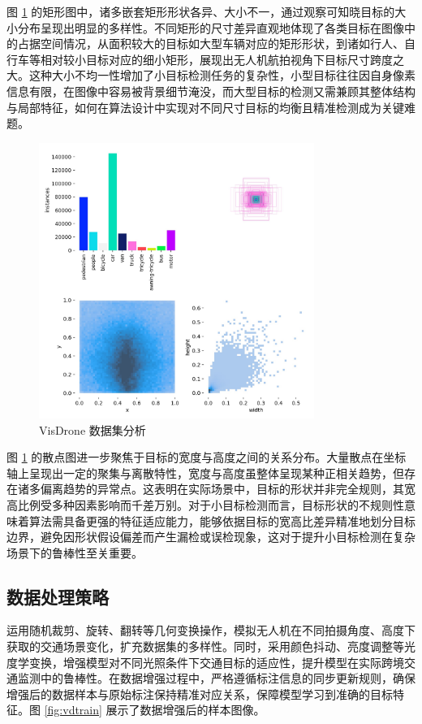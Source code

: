 \documentclass[runningheads]{llncs}
\begin{document}
图 \ref{fig:vdlabels} 的矩形图中，诸多嵌套矩形形状各异、大小不一，通过观察可知晓目标的大小分布呈现出明显的多样性。不同矩形的尺寸差异直观地体现了各类目标在图像中的占据空间情况，从面积较大的目标如大型车辆对应的矩形形状，到诸如行人、自行车等相对较小目标对应的细小矩形，展现出无人机航拍视角下目标尺寸跨度之大。这种大小不均一性增加了小目标检测任务的复杂性，小型目标往往因自身像素信息有限，在图像中容易被背景细节淹没，而大型目标的检测又需兼顾其整体结构与局部特征，如何在算法设计中实现对不同尺寸目标的均衡且精准检测成为关键难题。

\begin{figure}[htbp]
    \centering
    \includegraphics[width=0.8\textwidth]{../figure/labels.jpg}
    \caption{VisDrone 数据集分析}
    \label{fig:vdlabels}
\end{figure}

图 \ref{fig:vdlabels} 的散点图进一步聚焦于目标的宽度与高度之间的关系分布。大量散点在坐标轴上呈现出一定的聚集与离散特性，宽度与高度虽整体呈现某种正相关趋势，但存在诸多偏离趋势的异常点。这表明在实际场景中，目标的形状并非完全规则，其宽高比例受多种因素影响而千差万别。对于小目标检测而言，目标形状的不规则性意味着算法需具备更强的特征适应能力，能够依据目标的宽高比差异精准地划分目标边界，避免因形状假设偏差而产生漏检或误检现象，这对于提升小目标检测在复杂场景下的鲁棒性至关重要。

\subsection{数据处理策略}

运用随机裁剪、旋转、翻转等几何变换操作，模拟无人机在不同拍摄角度、高度下获取的交通场景变化，扩充数据集的多样性。同时，采用颜色抖动、亮度调整等光度学变换，增强模型对不同光照条件下交通目标的适应性，提升模型在实际跨境交通监测中的鲁棒性。在数据增强过程中，严格遵循标注信息的同步更新规则，确保增强后的数据样本与原始标注保持精准对应关系，保障模型学习到准确的目标特征。图 \ref{fig:vdtrain} 展示了数据增强后的样本图像。
\end{document}
